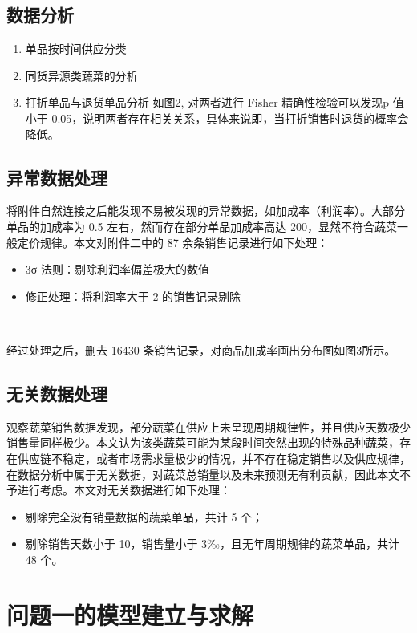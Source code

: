 \documentclass[withoutpreface,bwprint]{cumcmthesis} %
\begin{document}
\subsection{数据分析}

\begin{enumerate}[label=(\alph*)]
    \item 单品按时间供应分类
    \item 同货异源类蔬菜的分析
    \item 打折单品与退货单品分析
    如图2, 对两者进行 Fisher 精确性检验可以发现p 值小于 0.05，说明两者存在相关关系，具体来说即，当打折销售时退货的概率会降低。
\end{enumerate}

\subsection{异常数据处理}

将附件自然连接之后能发现不易被发现的异常数据，如加成率（利润率）。大部分单品的加成率为 0.5 左右，然而存在部分单品加成率高达 200，显然不符合蔬菜一般定价规律。本文对附件二中的 87 余条销售记录进行如下处理：
\begin{itemize}
    \item 3σ 法则：剔除利润率偏差极大的数值
    \item 修正处理：将利润率大于 2 的销售记录剔除
\end{itemize}\

经过处理之后，删去 16430 条销售记录，对商品加成率画出分布图如图3所示。


\subsection{无关数据处理}

观察蔬菜销售数据发现，部分蔬菜在供应上未呈现周期规律性，并且供应天数极少销售量同样极少。本文认为该类蔬菜可能为某段时间突然出现的特殊品种蔬菜，存在供应链不稳定，或者市场需求量极少的情况，并不存在稳定销售以及供应规律，在数据分析中属于无关数据，对蔬菜总销量以及未来预测无有利贡献，因此本文不予进行考虑。本文对无关数据进行如下处理：
\begin{itemize}
	\item 剔除完全没有销量数据的蔬菜单品，共计 5 个；
	\item 剔除销售天数小于 10，销售量小于 3‰，且无年周期规律的蔬菜单品，共计 48 个。
\end{itemize}

\section{问题一的模型建立与求解}
\end{document}
